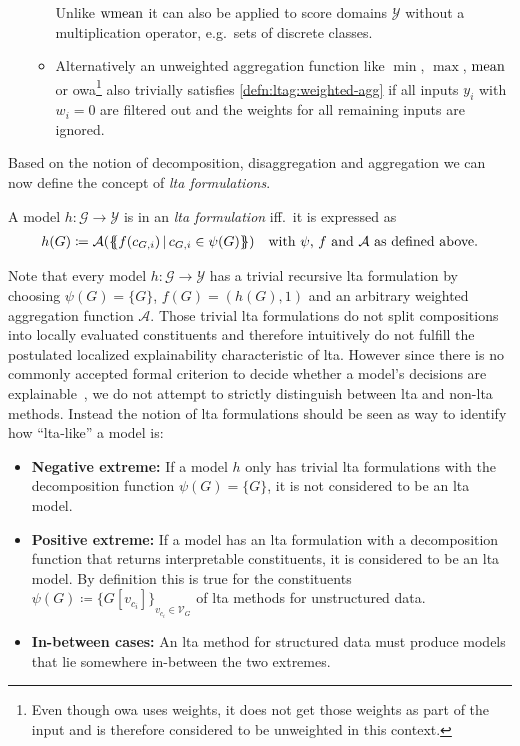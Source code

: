 \begin{enumerate}[label=\textbf{\arabic*.}]
\begin{itemize}
				Unlike $\operatorname{wmean}$ it can also be applied to score domains $\mathcal{Y}$ without a multiplication operator, e.g.\ sets of discrete classes.
			\item Alternatively an unweighted aggregation function like $\min$, $\max$, $\operatorname{mean}$ or \ac{owa}\footnote{
				Even though \ac{owa} uses weights, it does not get those weights as part of the input and is therefore considered to be unweighted in this context.
			} also trivially satisfies \cref{defn:ltag:weighted-agg} if all inputs $y_i$ with $w_i = 0$ are filtered out and the weights for all remaining inputs are ignored.
		\end{itemize}
\end{enumerate}
Based on the notion of decomposition, disaggregation and aggregation we can now define the concept of \textit{\ac{lta} formulations}.
\begin{defn}
	A model $h: \mathcal{G} \to \mathcal{Y}$ is in an \textit{\ac{lta} formulation} iff.\ it is expressed as
	\begin{align*}
		h(G) \coloneqq \mathcal{A}(\ldblbrace f(c_{G,i})\, |\, c_{G,i} \in \psi(G) \rdblbrace) \quad\text{with $\psi$, $f$ and $\mathcal{A}$ as defined above.}
	\end{align*}
\end{defn}
Note that every model $h: \mathcal{G} \to \mathcal{Y}$ has a trivial recursive \ac{lta} formulation by choosing $\psi(G) = \{ G \}$, $f(G) = (h(G), 1)$ and an arbitrary weighted aggregation function $\mathcal{A}$.
Those trivial \ac{lta} formulations do not split compositions into locally evaluated constituents and therefore intuitively do not fulfill the postulated localized explainability characteristic of \ac{lta}.
However since there is no commonly accepted formal criterion to decide whether a model's decisions are explainable~\cite{Lipton2018}, we do not attempt to strictly distinguish between \ac{lta} and non-\acs{lta} methods.
Instead the notion of \ac{lta} formulations should be seen as way to identify how ``\acs{lta}-like'' a model is:
\begin{itemize}
	\item \textbf{Negative extreme:}
		If a model $h$ only has trivial \ac{lta} formulations with the decomposition function $\psi(G) = \{ G \}$, it is not considered to be an \ac{lta} model.
	\item \textbf{Positive extreme:}
		If a model has an \ac{lta} formulation with a decomposition function that returns interpretable constituents, it is considered to be an \ac{lta} model.
		By definition this is true for the constituents $\psi(G) \coloneqq {\{ G[v_{c_i}] \}}_{v_{c_i} \in \mathcal{V}_G}$ of \ac{lta} methods for unstructured data.
	\item \textbf{In-between cases:}
		An \ac{lta} method for structured data must produce models that lie somewhere in-between the two extremes.
\end{itemize}

